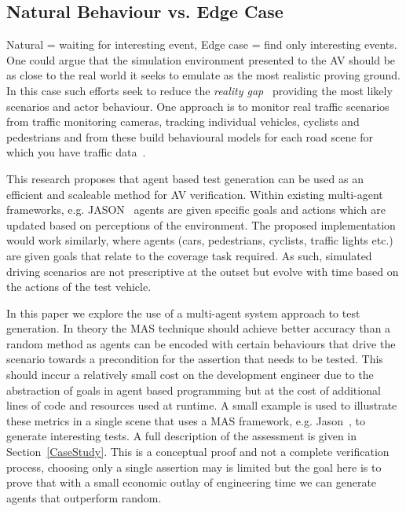 \documentclass[letterpaper, 10 pt, journal, twoside]{IEEEtran}
\begin{document}


\subsection{Natural Behaviour vs. Edge Case}
Natural = waiting for interesting event, Edge case = find only interesting events.
One could argue that the simulation environment presented to the AV should be as close to the real world it seeks to emulate as the most realistic proving ground. In this case such efforts seek to reduce the \textit{reality gap}~\cite{Jakobi1995} providing the most likely scenarios and actor behaviour. One approach is to monitor real traffic scenarios from traffic monitoring cameras, tracking individual vehicles, cyclists and pedestrians and from these build behavioural models for each road scene for which you have traffic data~\cite{latentlogic}. 


This research proposes that agent based test generation can be used as an efficient and scaleable method for AV verification. Within existing multi-agent frameworks, e.g. JASON~\cite{bordini2005jason} agents are given specific goals and actions which are updated based on perceptions of the environment. The proposed implementation would work similarly, where agents (cars, pedestrians, cyclists, traffic lights etc.) are given goals that relate to the coverage task required. As such, simulated driving scenarios are not prescriptive at the outset but evolve with time based on the actions of the test vehicle.





In this paper we explore the use of a multi-agent system approach to test generation. In theory the MAS technique should achieve better accuracy than a random method as agents can be encoded with certain behaviours that drive the scenario towards a precondition for the assertion that needs to be tested. 
%
This should inccur a relatively small cost on the development engineer due to the abstraction of goals in agent based programming but at the cost of additional lines of code and resources used at runtime. 
%
A small example is used to illustrate these metrics in a single scene that uses a MAS framework, e.g. Jason~\cite{bordini2005jason}, to generate interesting tests. A full description of the assessment is given in Section~\ref{CaseStudy}. 
%
This is a conceptual proof and not a complete verification process, choosing only a single assertion may is limited but the goal here is to prove that with a small economic outlay of engineering time we can generate agents that outperform random. 
\end{document}
